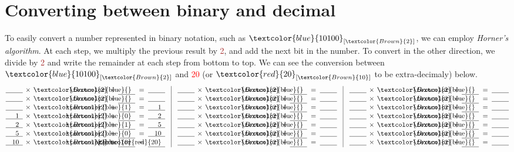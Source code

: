 \section*{Converting between binary and decimal%
}

\bgroup
\newcommand{\base}[1]{\textcolor{Brown}{#1}}
\newcommand{\bin}[1]{\textcolor{blue}{#1}}
\newcommand{\dec}[1]{\textcolor{red}{#1}}
\newcommand{\blankSize}{2.5em}
\newcommand{\blank}[1][]{\underline{\makebox[\blankSize][r]{#1\;\;}}}
\newcommand{\blankrow}[3]{%
  \blank[#1] \,\times\, \base{2} \,+\, \blank[\bin{#2}] \;=\; \blank[#3]}

To easily convert a number represented in binary notation, such as
$\bin{10100}_{[\base{2}]}$, we can employ \emph{Horner's algorithm}. At
each step, we multiply the previous result by \base{2}, and add the next
bit in the number. To convert in the other direction, we divide by \base{2}
and write the remainder at each step from bottom to top. We can see
the conversion between $\bin{10100}_{[\base{2}]}$ and \dec{20} (or
$\dec{20}_{[\base{10}]}$ to be extra-decimaly) below.
$$
\begin{array}{@{}l@{\hspace{0.9em}}
             |@{\hspace{0.9em}}l@{\hspace{0.9em}}
             |@{\hspace{0.9em}}l@{}}
\mathstrut
   \blankrow{}{}{}      & \blankrow{}{}{} & \blankrow{}{}{}
\\ \blankrow{}{}{}      & \blankrow{}{}{} & \blankrow{}{}{}
\\ \blankrow{}{1}{1}    & \blankrow{}{}{} & \blankrow{}{}{}
\\ \blankrow{1}{0}{2}   & \blankrow{}{}{} & \blankrow{}{}{}
\\ \blankrow{2}{1}{5}   & \blankrow{}{}{} & \blankrow{}{}{}
\\ \blankrow{5}{0}{10}  & \blankrow{}{}{} & \blankrow{}{}{}
\\ \blankrow{10}{0}{\dec{20}} & \blankrow{}{}{} & \blankrow{}{}{}
\end{array}
$$
\egroup

\vspace{-1ex}